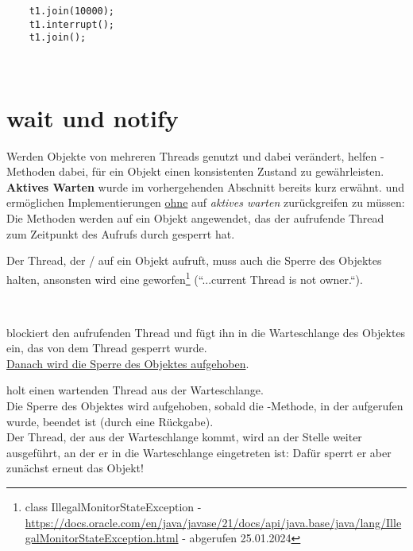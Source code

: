 \begin{verbatim}
    t1.join(10000);
    t1.interrupt();
    t1.join();
\end{verbatim}\\


\section{wait und notify}

Werden Objekte von mehreren Threads genutzt und dabei verändert, helfen -Methoden dabei, für ein Objekt einen konsistenten Zustand zu gewährleisten.\\

\noindent
\textbf{Aktives Warten} wurde im vorhergehenden Abschnitt bereits kurz erwähnt.
 und  ermöglichen Implementierungen \ul{ohne} auf \textit{aktives warten} zurückgreifen zu müssen: Die Methoden werden auf ein Objekt angewendet, das der aufrufende Thread zum Zeitpunkt des Aufrufs durch  gesperrt hat.

\begin{tcolorbox}
    Der Thread, der  /  auf ein Objekt aufruft, muss auch die Sperre des Objektes halten, ansonsten wird eine  geworfen\footnote{
    class IllegalMonitorStateException - \url{https://docs.oracle.com/en/java/javase/21/docs/api/java.base/java/lang/IllegalMonitorStateException.html} - abgerufen 25.01.2024
    } (``...current Thread is not owner.``).
\end{tcolorbox}\\

\begin{center}
\end{center}
\noindent
blockiert den aufrufenden Thread und fügt ihn in die Warteschlange des Objektes ein, das von dem Thread gesperrt wurde.\\
\ul{Danach wird die Sperre des Objektes aufgehoben}.

\begin{center}
\end{center}
\noindent
holt einen wartenden Thread aus der Warteschlange.\\
Die Sperre des Objektes wird aufgehoben, sobald die -Methode, in der  aufgerufen wurde, beendet ist (durch eine Rückgabe).\\
Der Thread, der aus der Warteschlange kommt, wird an der Stelle weiter ausgeführt, an der er in die Warteschlange eingetreten ist: Dafür sperrt er aber zunächst erneut das Objekt!

